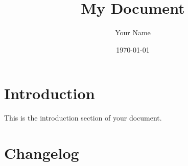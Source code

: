 \documentclass{article}
\begin{document}
\title{My Document}
\author{Your Name}
\date{\today}

\maketitle

\section{Introduction}
This is the introduction section of your document.

\section{Changelog}
\printfilelog
\end{document}
